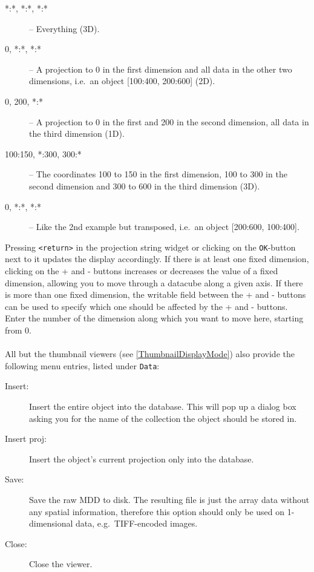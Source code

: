 \documentclass[11pt]{article}
\begin{document}
\begin{description}
\item[*:*, *:*, *:*] -- Everything (3D).
\item[0, *:*, *:*] -- A projection to 0 in the first dimension and all data in the other
two dimensions, i.e.\ an object [100:400, 200:600] (2D).
\item[0, 200, *:*] -- A projection to 0 in the first and 200 in the second dimension,
all data in the third dimension (1D).
\item[100:150, *:300, 300:*] -- The coordinates 100 to 150 in the first dimension,
100 to 300 in the second dimension and 300 to 600 in the third dimension (3D).
\item[0, *:*\rbrack, *:*\rbrack] -- Like the 2nd example but transposed,
i.e.\ an object [200:600, 100:400].
\end{description}

Pressing \texttt{<return>} in the projection string widget or clicking on the \texttt{OK}-button
next to it updates the display accordingly. If there is at least one fixed dimension, clicking
on the + and - buttons increases or decreases the value of a fixed dimension, allowing you
to move through a datacube along a given axis. If there is more than one fixed dimension,
the writable field between the + and - buttons can be used to specify which one should
be affected by the + and - buttons. Enter the number of the dimension along which you want
to move here, starting from 0.\\
\\
All but the thumbnail viewers (see \ref{ThumbnailDisplayMode}) also provide the following
menu entries, listed under \texttt{Data}:

\begin{description}
\item[Insert:] Insert the entire object into the database. This will pop up a
dialog box asking you for the name of the collection the object should be stored in.

\item[Insert proj:] Insert the object's current projection only into the
database.

\item[Save:] Save the raw MDD to disk. The resulting file is just the array data
without any spatial information, therefore this option should only be used on
1-dimensional data, e.g.\ TIFF-encoded images.

\item[Close:] Close the viewer.

\end{description}
\end{document}
